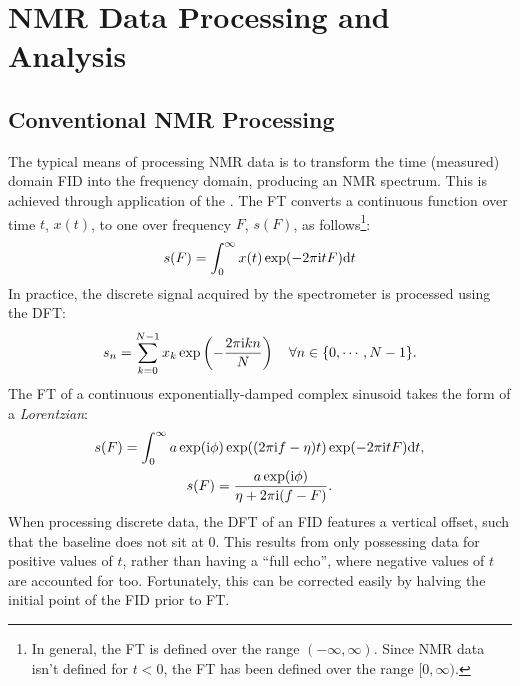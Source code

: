 \section{\acs{NMR} Data Processing and Analysis}

\subsection{Conventional NMR Processing}
\label{subsec:nmr-proc}
The typical means of processing \ac{NMR} data is to
transform the time (measured) domain \ac{FID} into the frequency domain,
producing an \ac{NMR} spectrum. This is achieved through application of the
. The \ac{FT} converts a continuous function over time $t$, $x(t)$, to
one over frequency $F$, $s(F)$, as follows\footnote{
    In general, the \ac{FT} is defined over the range $(-\infty, \infty)$.
    Since \ac{NMR} data isn't defined for $t < 0$, the \ac{FT} has been defined
    over the range  $[0, \infty)$.
}:
\begin{equation}
    s(F) =  \int_{0}^{\infty} x(t) \exp(
        -2 \pi \mathrm{i} t F
        ) \mathrm{d} t
\end{equation}
In practice, the discrete signal acquired by the spectrometer is processed
using the \ac{DFT}:
\begin{equation}
    s_n = \sum_{k=0}^{N-1} x_k \exp \left(
            -\frac{2 \pi \mathrm{i} k n}{N} \right)
            \quad \forall n \in \lbrace 0, \cdots, N-1 \rbrace.
\end{equation}
The \ac{FT} of a continuous exponentially-damped complex sinusoid
takes the form of a \emph{Lorentzian}:
\begin{subequations}
    \begin{gather}
        s(F) = \int_0^{\infty}
            a \exp(\mathrm{i} \phi) \exp((2 \pi \mathrm{i} f - \eta)t)
            \exp(-2 \pi \mathrm{i} t F)
            \mathrm{d} t,\\
        s(F) = \frac{a \exp(\mathrm{i} \phi) }
            {\eta + 2 \pi \mathrm{i} (f - F)}.
    \end{gather}
    \label{eq:lorentzian}
\end{subequations}
When processing discrete data, the \ac{DFT} of an \ac{FID}
features a vertical offset, such that the baseline does not sit at
0\cite{Tang1994}. This results from only possessing data for positive
values of $t$, rather than having a ``full echo'', where negative values of
$t$ are accounted for too. Fortunately, this can be corrected easily by
halving the initial point of the \ac{FID} prior to \ac{FT}.
